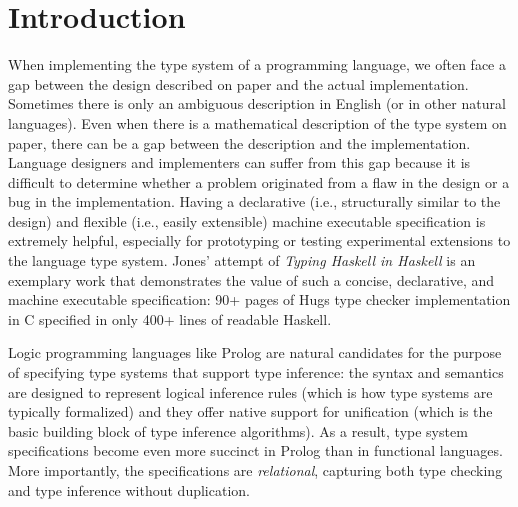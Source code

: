 \section{Introduction}\label{sec:intro}
When implementing the type system of a programming language, we often face
a gap between the design described on paper and the actual implementation.
Sometimes there is only an ambiguous description in English (or in other
natural languages). Even when there is a mathematical description of
the type system on paper, there can be a gap between the description and
the implementation. Language designers and implementers can suffer from
this gap because it is difficult to determine whether a problem originated
from a flaw in the design or a bug in the implementation.
Having a declarative (i.e., structurally similar to the design)
and flexible (i.e., easily extensible) machine executable specification
is extremely helpful, especially for prototyping or testing
experimental extensions to the language type system.  
Jones' attempt of \emph{Typing Haskell in Haskell} \cite{JonesTHiH99} is
an exemplary work that demonstrates the value of such a concise, declarative,
and machine executable specification: 90+ pages of Hugs type checker
implementation in C specified in only 400+ lines of readable Haskell.

Logic programming languages like Prolog are natural candidates for
the purpose of specifying type systems that support type inference:
the syntax and semantics are designed to represent logical inference rules
(which is how type systems are typically formalized) and they offer native
support for unification (which is the basic building block of type inference
algorithms). As a result, type system specifications become even more succinct
in Prolog than in functional languages. More importantly, the specifications
are \emph{relational}, capturing both type checking and type inference
without duplication.

